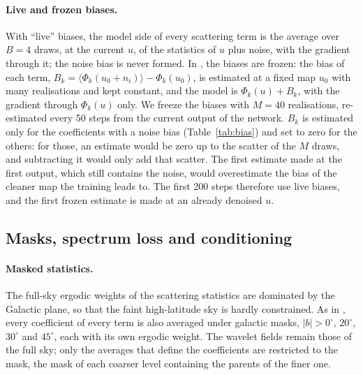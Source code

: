 \documentclass{aa}
\begin{document}
\paragraph{Live and frozen biases.} With ``live'' biases, the model side of every scattering term is the average over $B=4$ draws, at the current $u$, of the statistics of $u$ plus noise, with the gradient through it; the noise bias is never formed. In \citet{delouis2022}, the biases are frozen: the bias of each term, $B_k=\langle\Phi_k(u_0+n_i)\rangle-\Phi_k(u_0)$, is estimated at a fixed map $u_0$ with many realisations and kept constant, and the model is $\Phi_k(u)+B_k$, with the gradient through $\Phi_k(u)$ only. We freeze the biases with $M=40$ realisations, re-estimated every 50 steps from the current output of the network. $B_k$ is estimated only for the coefficients with a noise bias (Table~\ref{tab:bias}) and set to zero for the others: for those, an estimate would be zero up to the scatter of the $M$ draws, and subtracting it would only add that scatter. The first estimate made at the first output, which still contains the noise, would overestimate the bias of the cleaner map the training leads to. The first 200 steps therefore use live biases, and the first frozen estimate is made at an already denoised $u$.

\subsection{Masks, spectrum loss and conditioning}

\paragraph{Masked statistics.} The full-sky ergodic weights of the scattering statistics are dominated by the Galactic plane, so that the faint high-latitude sky is hardly constrained. As in \citet{delouis2022}, every coefficient of every term is also averaged under galactic masks, $|b|>0^\circ$, $20^\circ$, $30^\circ$ and $45^\circ$, each with its own ergodic weight. The wavelet fields remain those of the full sky; only the averages that define the coefficients are restricted to the mask, the mask of each coarser level containing the parents of the finer one.
\end{document}
